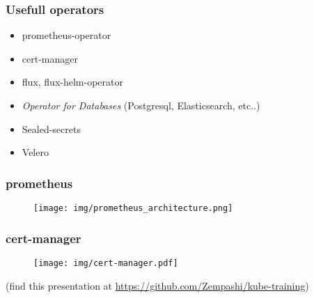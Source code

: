 \documentclass{beamer}
\begin{document}
\begin{frame}
  \frametitle{Usefull operators}
  \begin{itemize}
    \item prometheus-operator
    \item cert-manager
    \item flux, flux-helm-operator
    \item {\it Operator for Databases} (Postgresql, Elasticsearch, etc..)
    \item Sealed-secrets
    \item Velero
  \end{itemize}
\end{frame}

\begin{frame}
  \frametitle{prometheus}
  \begin{figure}
    \begin{center}
      \texttt{[image: img/prometheus\_architecture.png]}
    \end{center}
  \end{figure}
\end{frame}

\begin{frame}
  \frametitle{cert-manager}
  \begin{figure}
    \begin{center}
      \texttt{[image: img/cert-manager.pdf]}
    \end{center}
  \end{figure}
\end{frame}

\begin{frame}
\vfill
{}
\vfill
(find this presentation at \href{https://github.com/Zempashi/kube-training}{https://github.com/Zempashi/kube-training})
\end{frame}
\end{document}
